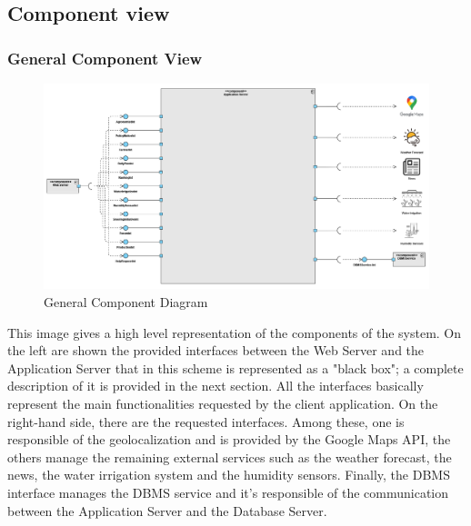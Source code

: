 \documentclass[table, 12pt]{article}
\begin{document}
\subsection{Component view}
\subsubsection*{General Component View}
\begin{center}
    \begin{figure}[H]
        \includegraphics[scale=0.45, center]{assets/general-component-view.png}
        \caption{General Component Diagram}
        \label{fig: general_component_view}
    \end{figure}
\end{center}

This image gives a high level representation of the components of the system.
On the left are shown the provided interfaces between the Web Server and the Application Server that in this scheme is represented as a "black box"; a complete description of it is provided in the next section.
All the interfaces basically represent the main functionalities requested by the client application.
On the right-hand side, there are the requested interfaces. Among these, one is responsible of the geolocalization and is provided by the Google Maps API, the others manage the remaining external services such as the weather forecast, the news, the water irrigation system and the humidity sensors.
Finally, the DBMS interface manages the DBMS service and it's responsible of the communication between the Application Server and the Database Server.
\end{document}
